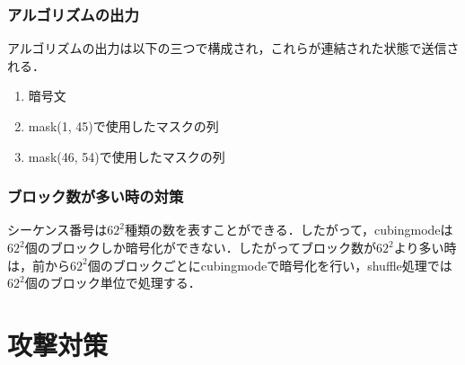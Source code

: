 \documentclass[titlepage]{jarticle}
\begin{document}
\subsubsection{アルゴリズムの出力}
アルゴリズムの出力は以下の三つで構成され，これらが連結された状態で送信される．
\begin{screen}
  \begin{enumerate}
    \item 暗号文
    \item mask(\hspace{1.8mm}1, 45)で使用したマスクの列
    \item mask(46, 54)で使用したマスクの列
  \end{enumerate}
\end{screen}

\subsubsection{ブロック数が多い時の対策}
シーケンス番号は\(62^2\)種類の数を表すことができる．したがって，cubingmodeは\(62^2\)個のブロックしか暗号化ができない．したがってブロック数が\(62^2\)より多い時は，前から\(62^2\)個のブロックごとにcubingmodeで暗号化を行い，shuffle処理では\(62^2\)個のブロック単位で処理する．

\section{攻撃対策}
\end{document}
